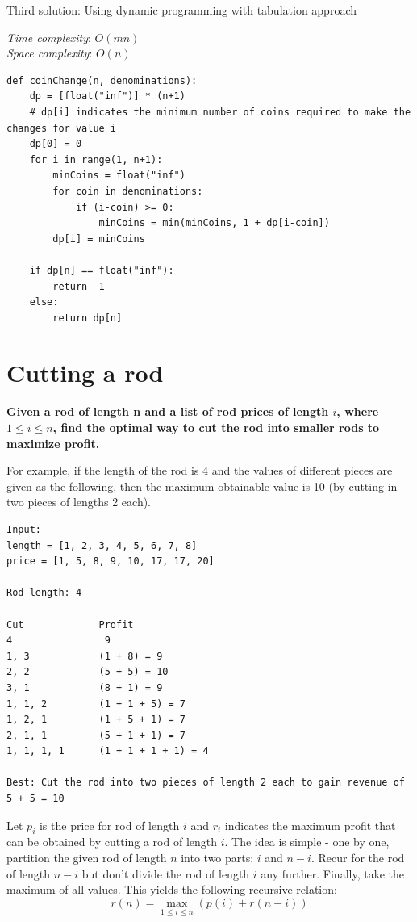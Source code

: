 \documentclass[a4paper,11pt]{book}
\begin{document}
\noindent Third solution: Using dynamic programming with tabulation approach

\noindent \textit{Time complexity}: $O(mn)$\\
\noindent \textit{Space complexity}: $O(n)$

\begin{lstlisting}
def coinChange(n, denominations):
    dp = [float("inf")] * (n+1) 
    # dp[i] indicates the minimum number of coins required to make the changes for value i
    dp[0] = 0
    for i in range(1, n+1):
        minCoins = float("inf")
        for coin in denominations:
            if (i-coin) >= 0:
                minCoins = min(minCoins, 1 + dp[i-coin])
        dp[i] = minCoins
    
    if dp[n] == float("inf"):
        return -1
    else:
        return dp[n]
\end{lstlisting}

\newpage
\section{Cutting a rod}

\textbf{Given a rod of length n and a list of rod prices of length $i$, where $1 \leq i \leq n$, find the optimal way to cut the rod into smaller rods to maximize profit.}

\vspace{5mm}

\noindent For example, if the length of the rod is 4 and the values of different pieces are given as the following, then the maximum obtainable value is 10 (by cutting in two pieces of lengths 2 each).

\begin{lstlisting}
Input:
length = [1, 2, 3, 4, 5, 6, 7, 8]
price = [1, 5, 8, 9, 10, 17, 17, 20]
 
Rod length: 4

Cut             Profit
4                9
1, 3            (1 + 8) = 9
2, 2            (5 + 5) = 10
3, 1            (8 + 1) = 9
1, 1, 2         (1 + 1 + 5) = 7
1, 2, 1         (1 + 5 + 1) = 7
2, 1, 1         (5 + 1 + 1) = 7
1, 1, 1, 1      (1 + 1 + 1 + 1) = 4

Best: Cut the rod into two pieces of length 2 each to gain revenue of 5 + 5 = 10
\end{lstlisting}

\noindent Let $p_i$ is the price for rod of length $i$ and $r_i$ indicates the maximum profit that can be obtained by cutting a rod of length $i$. The idea is simple - one by one, partition the given rod of length $n$ into two parts: $i$ and $n-i$. Recur for the rod of length $n-i$ but don't divide the rod of length $i$ any further. Finally, take the maximum of all values. This yields the following recursive relation:
$$r(n) = \max_{1 \leq i \leq n}\left(p(i) + r(n-i)\right)$$
\end{document}
